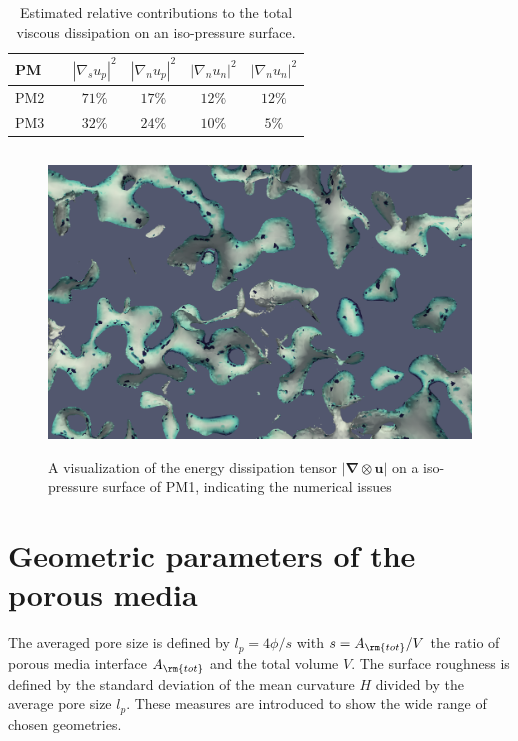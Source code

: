 \documentclass[draft,jgrga]{agutexSI2019}
\begin{document}
\begin{table}[htbp!]\label{tab:sm1}
\centering
\begin{tabular}{l|c|c|c|c|c}
PM & & $\left|\nabla_s u_p\right|^2$ & $ \left|\nabla_n u_p\right|^2$ & $\left|\nabla_n u_n\right|^2$ & $\left|\nabla_n u_n\right|^2$ \\
\hline
PM2 &  & $71 \%$ & $17\%$ & $12\%$ & $12\%$ \\
PM3 &  & $32 \%$ & $24\%$ & $10\%$ & $5\%$ \\
\end{tabular}
\caption{\label{tab:table-name}Estimated relative contributions to the total viscous dissipation on an iso-pressure surface. }
\end{table}




\begin{figure}
\noindent\includegraphics[height=8cm]{figures/nummeric_noise.png}
\caption{A visualization of the energy dissipation tensor $|\mathbf{\nabla}\otimes \mathbf{u}|$ on a iso-pressure surface of PM1, indicating the numerical issues}
\label{fig:numerical noise}
\end{figure}

\section{Geometric parameters of the porous media}


The averaged pore size is defined by $l_p = 4 \phi/s$ with $s= A_{\rm{tot}}/V$ the ratio of porous media interface $A_{\rm{tot}}$ and the total volume $V$. The surface roughness is defined by the standard deviation of the mean curvature $H$ divided by the average pore size $l_p$. These measures are introduced to show the wide range of chosen geometries. 
\end{document}
